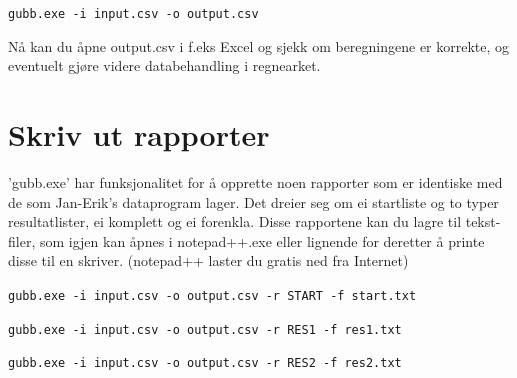 \documentclass[12pt]{book}
\begin{document}
\begin{alltt}
\texttt{gubb.exe -i input.csv -o output.csv  {\Return} }
\end{alltt}

Nå kan du åpne output.csv i f.eks Excel og sjekk om beregningene er korrekte, og eventuelt gjøre videre databehandling i regnearket.

\section{Skriv ut rapporter}

'gubb.exe' har funksjonalitet for å opprette noen rapporter som er identiske med de som Jan-Erik's dataprogram lager. Det dreier seg om ei startliste og to typer resultatlister, ei komplett og ei forenkla. Disse rapportene kan du lagre til tekst-filer, som igjen kan åpnes i notepad++.exe eller lignende for deretter å printe disse til en skriver. (notepad++ laster du gratis ned fra Internet)


\begin{alltt}
\texttt{gubb.exe -i input.csv -o output.csv -r START -f start.txt  {\Return} }

\texttt{gubb.exe -i input.csv -o output.csv -r RES1 -f res1.txt  {\Return} }

\texttt{gubb.exe -i input.csv -o output.csv -r RES2 -f res2.txt  {\Return} }
\end{alltt}
\end{document}
